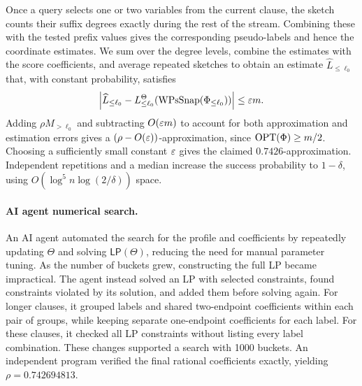 Once a query selects one or two variables from the current clause, the sketch counts their suffix degrees exactly during the rest of the stream. Combining these with the tested prefix values gives the corresponding pseudo-labels and hence the coordinate estimates. We sum over the degree levels, combine the estimates with the score coefficients, and average repeated sketches to obtain an estimate $\widehat L_{\le\ell_0}$ that, with constant probability, satisfies
\[
\left|\widehat L_{\le\ell_0}-L_{\le\ell_0}^\Theta(\operatorname{WPsSnap}(\Phi_{\le\ell_0}))\right|\le\varepsilon m.
\]
Adding $\rho M_{>\ell_0}$ and subtracting $O(\varepsilon m)$ to account for both approximation and estimation errors gives a $(\rho-O(\varepsilon))$-approximation, since $\operatorname{OPT}(\Phi)\ge m/2$. Choosing a sufficiently small constant $\varepsilon$ gives the claimed $0.7426$-approximation. Independent repetitions and a median increase the success probability to $1-\delta$, using $O(\log^5 n\log(2/\delta))$ space.










\paragraph{AI agent  numerical search.}
An AI agent automated the search for the profile and coefficients  by repeatedly updating $\Theta$ and solving  $\mathsf{LP}(\Theta)$, reducing the need for manual parameter tuning.
As the number of buckets grew, constructing the full LP became impractical.
The agent instead solved an LP with selected constraints, found constraints violated by its solution, and added them before solving again.
For longer clauses, it grouped labels and shared two-endpoint coefficients within each pair of groups, while keeping separate one-endpoint coefficients for each label.
For these clauses, it checked all LP constraints without listing every label combination.
These changes supported a search with 1000 buckets.
An independent program verified the final rational coefficients exactly, yielding $\rho=0.742694813$.